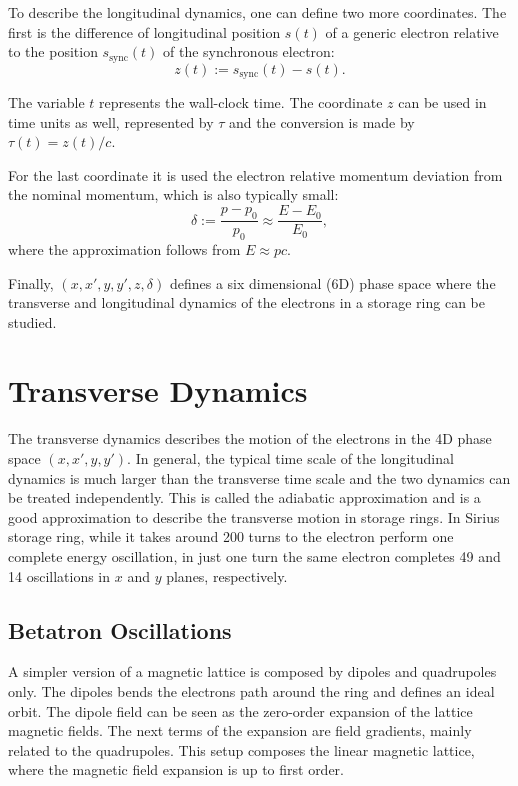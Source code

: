To describe the longitudinal dynamics, one can define two more coordinates. The first is the difference of longitudinal position $s(t)$ of a generic electron relative to the position $s_{\mathrm{sync}}(t)$ of the synchronous electron:
\begin{equation}
    z(t) := s_{\mathrm{sync}}(t) - s(t).
\end{equation}

The variable $t$ represents the wall-clock time. The coordinate $z$ can be used in time units as well, represented by $\tau$ and the conversion is made by $\tau(t) = z(t)/c$. 

For the last coordinate it is used the electron relative momentum deviation from the nominal momentum, which is also typically small:
\begin{equation}
    \delta := \frac{p - p_0}{p_0} \approx \frac{E - E_0}{E_0},
\end{equation}
where the approximation follows from $E \approx pc$.

Finally, $(x, x', y, y', z, \delta)$ defines a six dimensional (6D) phase space where the transverse and longitudinal dynamics of the electrons in a storage ring can be studied.
\section{Transverse Dynamics}\label{tranverse}
The transverse dynamics describes the motion of the electrons in the 4D phase space $(x, x', y, y')$. In general, the typical time scale of the longitudinal dynamics is much larger than the transverse time scale and the two dynamics can be treated independently. This is called the adiabatic approximation and is a good approximation to describe the transverse motion in storage rings. In Sirius storage ring, while it takes around 200 turns to the electron perform one complete energy oscillation, in just one turn the same electron completes 49 and 14 oscillations in $x$ and $y$ planes, respectively.

\subsection{Betatron Oscillations}
A simpler version of a magnetic lattice is composed by dipoles and quadrupoles only. The dipoles bends the electrons path around the ring and defines an ideal orbit. The dipole field can be seen as the zero-order expansion of the lattice magnetic fields. The next terms of the expansion are field gradients, mainly related to the quadrupoles. This setup composes the linear magnetic lattice, where the magnetic field expansion is up to first order.

